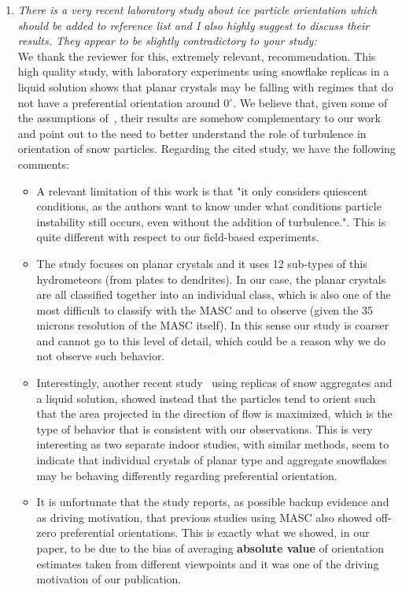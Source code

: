 \documentclass[12pt]{article}
\begin{document}
\begin{enumerate}
    
    \item \textit{There is a very recent laboratory study about ice particle orientation which should be added to reference list and I also highly suggest to discuss their results. They appear to be slightly contradictory to your study:} \cite{Stout_ACP_2024} \\

    We thank the reviewer for this, extremely relevant, recommendation.  This high quality study, with laboratory experiments using snowflake replicas in a liquid solution shows that planar crystals may be falling with regimes that do not have a preferential orientation around 0$^\circ$. We believe that, given some of the assumptions of~\cite{Stout_ACP_2024}, their results are somehow complementary to our work and point out to the need to better understand the role of turbulence in orientation of snow particles. Regarding the cited study, we have the following comments:
    \begin{itemize}
        \item A relevant limitation of this work is that "it  only considers quiescent conditions, as the authors want to know under what conditions particle instability still occurs, even without the addition of turbulence.". This is quite different with respect to our field-based experiments.
        \item The study focuses on planar crystals and it uses 12 sub-types of this  hydrometeors (from plates to dendrites). In our case, the planar crystals are all classified together into an individual class, which is also one of the most difficult to classify with the MASC and to observe (given the 35 microns resolution of the MASC itself). In this sense our study is coarser and cannot go to this level of detail, which could be a reason why we do not observe such behavior. 
        \item Interestingly, another recent study~\cite{Koebschall_EF_2023} using replicas of snow aggregates and a liquid solution, showed instead that the particles tend to orient such that the area projected in the direction of flow is maximized, which is the type of behavior that is consistent with our observations. This is very interesting as two separate indoor studies, with similar methods, seem to indicate that individual crystals of planar type and aggregate snowflakes may be behaving differently regarding preferential orientation.
        \item It is unfortunate that the study reports, as possible backup evidence and as driving motivation, that previous studies using MASC also showed off-zero preferential orientations. This is exactly what we showed, in our paper, to be due to the bias of averaging \textbf{absolute value} of orientation estimates taken from different viewpoints and it was one of the driving motivation of our publication.  

\end{itemize}
\end{enumerate}
\end{document}
